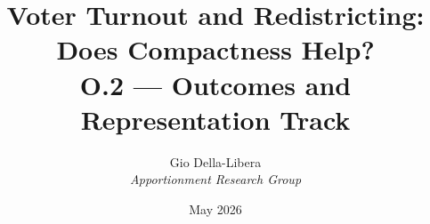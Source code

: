 \documentclass[12pt]{article}
\title{\textbf{Voter Turnout and Redistricting:\\
Does Compactness Help?}\\[0.4em]
\large O.2 --- Outcomes and Representation Track}
\author{Gio Della-Libera \\ \textit{Apportionment Research Group}}
\date{May 2026}
\begin{document}
\maketitle
\begin{abstract}\end{abstract}






\end{document}
